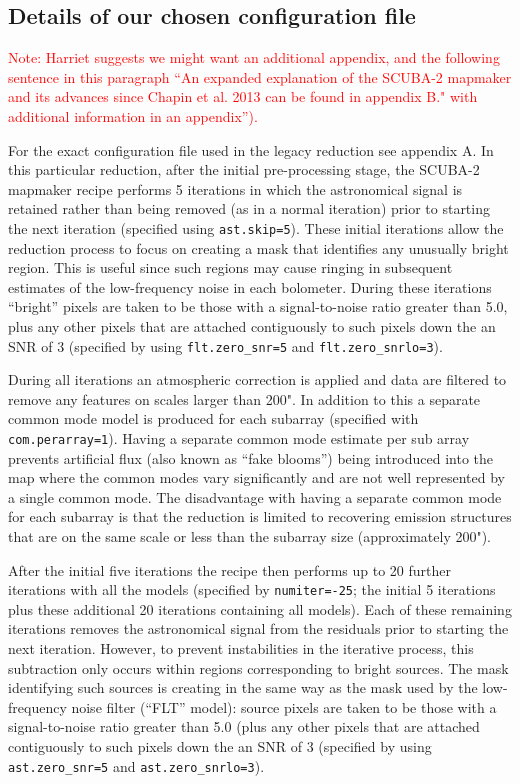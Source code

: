 \documentclass[twocolumn,times]{aastex6}
\newcommand{\note}[1]{\textcolor{red}{Note: #1}}
\begin{document}
\subsection{Details of our chosen configuration file}

\note{Harriet suggests we might want an additional appendix, and the
  following sentence in this paragraph ``An expanded explanation of
  the SCUBA-2 mapmaker and its advances since Chapin et al. 2013 can
  be found in appendix B." with additional information in an
  appendix'').}



For the exact configuration file used in the legacy reduction see
appendix A. In this particular reduction, after the initial
pre-processing stage, the SCUBA-2 mapmaker recipe performs 5
iterations in which the astronomical signal is retained rather than
being removed (as in a normal iteration) prior to starting the next
iteration (specified using \texttt{ast.skip=5}). These initial
iterations allow the reduction process to focus on creating a mask
that identifies any unusually bright region. This is useful since such
regions may cause ringing in subsequent estimates of the low-frequency
noise in each bolometer. During these iterations ``bright'' pixels are
taken to be those with a signal-to-noise ratio greater than 5.0, plus
any other pixels that are attached contiguously to such pixels down
the an SNR of 3 (specified by using \texttt{flt.zero\_snr=5} and
\texttt{flt.zero\_snrlo=3}).

During all iterations an atmospheric correction is applied and data
are filtered to remove any features on scales larger than 200". In
addition to this a separate common mode model is produced for each
subarray (specified with \texttt{com.perarray=1}). Having a separate
common mode estimate per sub array prevents artificial flux (also
known as ``fake blooms'') being introduced into the map where the
common modes vary significantly and are not well represented by a
single common mode. The disadvantage with having a separate common
mode for each subarray is that the reduction is limited to recovering
emission structures that are on the same scale or less than the
subarray size (approximately 200").

After the initial five iterations the recipe then performs up to 20
further iterations with all the models (specified by
\texttt{numiter=-25}; the initial 5 iterations plus these additional 20
iterations containing all models). Each of these remaining iterations
removes the astronomical signal from the residuals prior to starting
the next iteration. However, to prevent instabilities in the iterative
process, this subtraction only occurs within regions corresponding to
bright sources.  The mask identifying such sources is creating in the
same way as the mask used by the low-frequency noise filter (``FLT''
model): source pixels are taken to be those with a signal-to-noise
ratio greater than 5.0 (plus any other pixels that are attached
contiguously to such pixels down the an SNR of 3 (specified by using
\texttt{ast.zero\_snr=5} and \texttt{ast.zero\_snrlo=3}).
\end{document}
